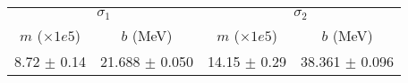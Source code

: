 \begin{tabular}{cc|cc}
\multicolumn{2}{c|}{$\sigma_1$} & \multicolumn{2}{|c}{$\sigma_2$} \\
$m$ ($\times1e5$) & $b$ (MeV) & $m$ ($\times1e5$) & $b$ (MeV) \\
\hline
8.72 $\pm$ 0.14 & 21.688 $\pm$ 0.050 & 14.15 $\pm$ 0.29 & 38.361 $\pm$ 0.096\\
\end{tabular}
